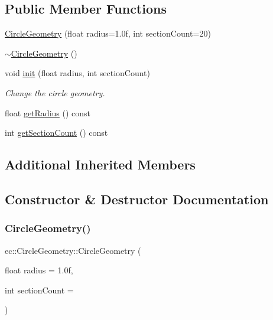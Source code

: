 \subsection*{Public Member Functions}
\begin{DoxyCompactItemize}
\item 
\mbox{\hyperlink{classec_1_1_circle_geometry_addbe5d69b86093eb1002638e24f2de18}{Circle\+Geometry}} (float radius=1.\+0f, int section\+Count=20)
\item 
\mbox{\hyperlink{classec_1_1_circle_geometry_a1cba969c53a5379e281c720883d932e7}{$\sim$\+Circle\+Geometry}} ()
\item 
void \mbox{\hyperlink{classec_1_1_circle_geometry_aef6ab090302b5370c4369ec3f806f98e}{init}} (float radius, int section\+Count)
\begin{DoxyCompactList}\small\item\em Change the circle geometry. \end{DoxyCompactList}\item 
float \mbox{\hyperlink{classec_1_1_circle_geometry_a7926a1f020f9b4998e0d4be0912b7b80}{get\+Radius}} () const
\item 
int \mbox{\hyperlink{classec_1_1_circle_geometry_a68648b12d6d2d7ffaf39d141f758e22b}{get\+Section\+Count}} () const
\end{DoxyCompactItemize}
\subsection*{Additional Inherited Members}


\subsection{Constructor \& Destructor Documentation}
\mbox{\label{classec_1_1_circle_geometry_addbe5d69b86093eb1002638e24f2de18}} 
\subsubsection{\texorpdfstring{Circle\+Geometry()}{CircleGeometry()}}
{\footnotesize\ttfamily ec\+::\+Circle\+Geometry\+::\+Circle\+Geometry (\begin{DoxyParamCaption}\item[{float}]{radius = {\ttfamily 1.0f},  }\item[{int}]{section\+Count = {} }\end{DoxyParamCaption})\hspace{0.3cm}{\ttfamily [explicit]}}

